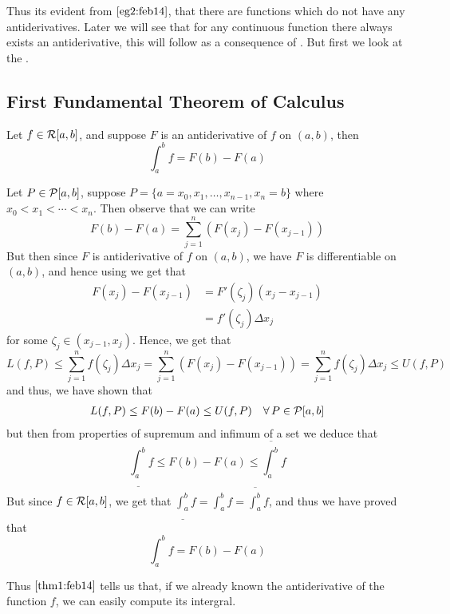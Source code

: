 Thus its evident from  $\ref{eg2:feb14}$, that there are functions which do not have any antiderivatives. Later we will see that for any continuous function there always exists an antiderivative, this will follow as a consequence of . But first we look at the .

\subsection{First Fundamental Theorem of Calculus}

\begin{thm}\label{thm1:feb14}
    Let $f \in \mathcal{R}[a,b]$, and suppose $F$ is an antiderivative of $f$ on $(a,b)$, then 
    \[
        \int_a^b f = F(b) - F(a)  
    \] 
\end{thm}
\begin{prf}
    Let $P \in \mathcal{P}[a,b]$, suppose $ P = \{a=x_0, x_1, \dots, x_{n-1},x_n =b\}$ where $x_0 < x_1 < \cdots < x_n $. Then observe that we can write 
    \[ 
        F(b) - F(a) = \sum_{j=1}^n (F(x_j) - F(x_{j-1}))    
    \] 
    But then since $F$ is antiderivative of $f$ on $(a,b)$, we have $F$ is differentiable on $(a,b)$, and hence using  we get that 
    \begin{align*}
        F(x_j) - F(x_{j-1}) &= F'(\zeta_j) (x_j - x_{j-1}) \\ 
                            &= f'(\zeta_j) \Delta x_j
    \end{align*}
    for some $\zeta_j \in (x_{j-1},x_j)$. Hence, we get that 
    \[
        L(f,P) \leq \sum_{j=1}^n f(\zeta_j) \Delta x_j = \sum_{j=1}^n (F(x_j) - F(x_{j-1})) = \sum_{j=1}^n f(\zeta_j) \Delta x_j \leq U(f,P)  
    \]
    and thus, we have shown that 
    \begin{align}\label{eq1:feb14}
        L(f,P) \leq F(b) - F(a) \leq U(f,P) &&\forall \, P \in \mathcal{P}[a,b] 
    \end{align}
    but then from properties of supremum and infimum of a set we deduce that 
    \[
        \underline{\int_a^b} f \leq F(b) - F(a) \leq \overline{\int_a^b} f   
    \]
    But since $f \in \mathcal{R}[a,b]$, we get that $\underline{\int_a^b}f = \int_a^b f = \overline{\int_a^b} f$, and thus we have proved that 
    \[
        \int_a^b f = F(b) - F(a)  
    \]
\end{prf}

Thus  $\ref{thm1:feb14}$ tells us that, if we already known the antiderivative of the function $f$, we can easily compute its intergral.

